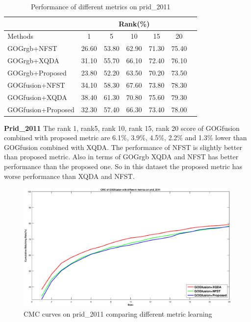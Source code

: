 \documentclass[conference,compsoc]{IEEEtran}
\begin{document}


\begin{table}[H]
\caption{Performance of different metrics on prid\_2011}
\centering
\begin{tabular}{|l|c|c|c|c|c|c|}
\hline
& \multicolumn{5}{|c|}{Rank(\%)} \\
\hline
Methods& 1 & 5 &10& 15&20\\
\hline
GOGrgb+NFST&26.60 &53.80& 62.90&71.30&75.40 \\ 
\hline
GOGrgb+XQDA&31.10 & 55.70& 66.10 & 72.40&76.10\\  
\hline
GOGrgb+Proposed&23.80&52.20&63.50&70.20&73.50\\  %
\hline
GOGfusion+NFST&34.10 &58.30& 67.60&73.80&78.30 \\  
\hline
GOGfusion+XQDA&38.40& 61.30&70.80&75.60&79.30\\
\hline
GOGfusion+Proposed&32.30&57.40&66.30&73.40&78.00\\ %

\hline

\end{tabular}\newline
\end{table}
\textbf{Prid\_2011}  The  rank 1, rank5, rank 10, rank 15, rank 20 score of GOGfusion  combined with proposed metric are 6.1\%, 3.9\%, 4.5\%, 2.2\% and 1.3\% lower than GOGfusion combined with XQDA. The performance of NFST is slightly better than proposed metric. Also in terms of GOGrgb XQDA and NFST has better performance than the proposed one. So in this dataset the proposed metric has worse performance than XQDA and NFST.

\begin{figure}
\begin{raggedleft}
\includegraphics[width=1\linewidth]{prid2011.eps}
\vspace{-3em}
\caption{CMC curves on prid\_2011 comparing different metric learning}
\end{raggedleft}
\end{figure}
\end{document}
